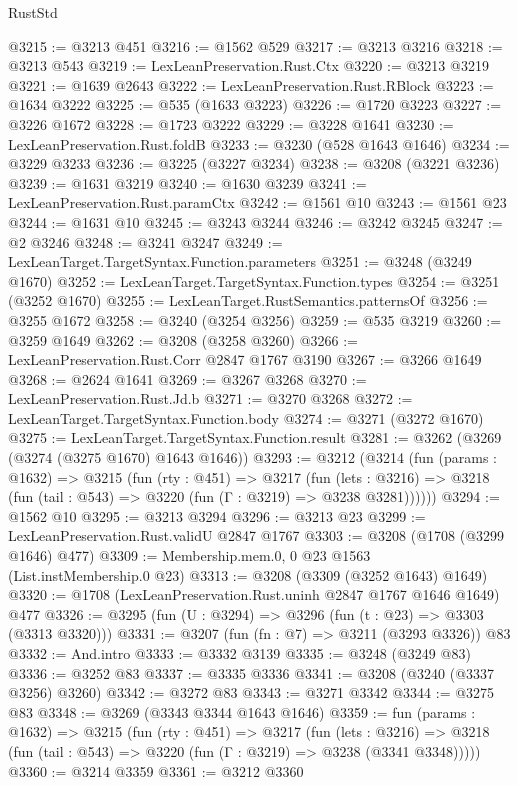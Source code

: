 \begin{lexlean}{RustStd}
\begin{coremodule}
@3215 := @3213 @451
@3216 := @1562 @529
@3217 := @3213 @3216
@3218 := @3213 @543
@3219 := LexLeanPreservation.Rust.Ctx
@3220 := @3213 @3219
@3221 := @1639 @2643
@3222 := LexLeanPreservation.Rust.RBlock
@3223 := @1634 @3222
@3225 := @535 (@1633 @3223)
@3226 := @1720 @3223
@3227 := @3226 @1672
@3228 := @1723 @3222
@3229 := @3228 @1641
@3230 := LexLeanPreservation.Rust.foldB
@3233 := @3230 (@528 @1643 @1646)
@3234 := @3229 @3233
@3236 := @3225 (@3227 @3234)
@3238 := @3208 (@3221 @3236)
@3239 := @1631 @3219
@3240 := @1630 @3239
@3241 := LexLeanPreservation.Rust.paramCtx
@3242 := @1561 @10
@3243 := @1561 @23
@3244 := @1631 @10
@3245 := @3243 @3244
@3246 := @3242 @3245
@3247 := @2 @3246
@3248 := @3241 @3247
@3249 := LexLeanTarget.TargetSyntax.Function.parameters
@3251 := @3248 (@3249 @1670)
@3252 := LexLeanTarget.TargetSyntax.Function.types
@3254 := @3251 (@3252 @1670)
@3255 := LexLeanTarget.RustSemantics.patternsOf
@3256 := @3255 @1672
@3258 := @3240 (@3254 @3256)
@3259 := @535 @3219
@3260 := @3259 @1649
@3262 := @3208 (@3258 @3260)
@3266 := LexLeanPreservation.Rust.Corr @2847 @1767 @3190
@3267 := @3266 @1649
@3268 := @2624 @1641
@3269 := @3267 @3268
@3270 := LexLeanPreservation.Rust.Jd.b
@3271 := @3270 @3268
@3272 := LexLeanTarget.TargetSyntax.Function.body
@3274 := @3271 (@3272 @1670)
@3275 := LexLeanTarget.TargetSyntax.Function.result
@3281 := @3262 (@3269 (@3274 (@3275 @1670) @1643 @1646))
@3293 := @3212
    (@3214
      (fun (params : @1632) =>
      @3215
        (fun (rty : @451) =>
        @3217
          (fun (lets : @3216) =>
          @3218 (fun (tail : @543) => @3220 (fun (Γ : @3219) => @3238 @3281))))))
@3294 := @1562 @10
@3295 := @3213 @3294
@3296 := @3213 @23
@3299 := LexLeanPreservation.Rust.validU @2847 @1767
@3303 := @3208 (@1708 (@3299 @1646) @477)
@3309 := Membership.mem.{0, 0} @23 @1563 (List.instMembership.{0} @23)
@3313 := @3208 (@3309 (@3252 @1643) @1649)
@3320 := @1708 (LexLeanPreservation.Rust.uninh @2847 @1767 @1646 @1649) @477
@3326 := @3295 (fun (U : @3294) => @3296 (fun (t : @23) => @3303 (@3313 @3320)))
@3331 := @3207 (fun (fn : @7) => @3211 (@3293 @3326)) @83
@3332 := And.intro
@3333 := @3332 @3139
@3335 := @3248 (@3249 @83)
@3336 := @3252 @83
@3337 := @3335 @3336
@3341 := @3208 (@3240 (@3337 @3256) @3260)
@3342 := @3272 @83
@3343 := @3271 @3342
@3344 := @3275 @83
@3348 := @3269 (@3343 @3344 @1643 @1646)
@3359 := fun (params : @1632) =>
  @3215
    (fun (rty : @451) =>
    @3217
      (fun (lets : @3216) =>
      @3218 (fun (tail : @543) => @3220 (fun (Γ : @3219) => @3238 (@3341 @3348)))))
@3360 := @3214 @3359
@3361 := @3212 @3360

\end{coremodule}
\end{lexlean}
